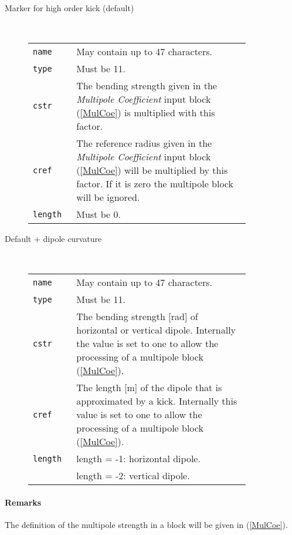 \begin{description}
    \item [Marker for high order kick (default)]~

    \bigskip
    \begin{tabular}{@{}lp{0.8\linewidth}}
        \texttt{name} & May contain up to 47 characters. \\
        \texttt{type} & Must be 11. \\
        \texttt{cstr} & The bending strength given in the \textit{Multipole Coefficient} input block (\ref{MulCoe}) is multiplied with this factor.\\
        \texttt{cref} & The reference radius given in the \textit{Multipole Coefficient} input block (\ref{MulCoe}) will be multiplied by this factor. If it is zero the multipole block will be ignored.\\
        \texttt{length} & Must be 0.
    \end{tabular}
    \item [Default + dipole curvature]~

    \bigskip
    \begin{tabular}{@{}lp{0.8\linewidth}}
        \texttt{name} & May contain up to 47 characters. \\
        \texttt{type} & Must be 11. \\
        \texttt{cstr} & The bending strength [rad] of horizontal or vertical dipole. Internally the value is set to one to allow the processing of a multipole block (\ref{MulCoe}).\\
        \texttt{cref} & The length [m] of the dipole that is approximated by a kick. Internally this value is set to one to allow the processing of a multipole block (\ref{MulCoe}). \\
        \texttt{length} & length = -1: horizontal dipole. \\
                        & length = -2: vertical dipole.
    \end{tabular}
\end{description}

\paragraph{Remarks}
The definition of the multipole strength in a block will be given in (\ref{MulCoe}).


